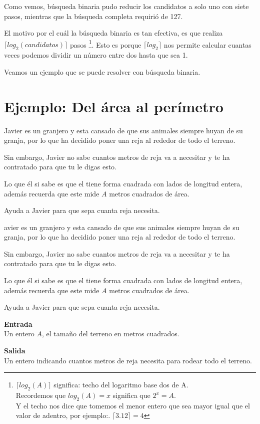 Como vemos, búsqueda binaria pudo reducir los candidatos a solo uno con siete pasos, mientras que la búsqueda completa requirió de 127.

El motivo por el cuál la búsqueda binaria es tan efectiva, es que realiza \(\lceil log_2(candidatos) \rceil\) pasos \footnote{\(\lceil log_2(A) \rceil \) significa: techo del logaritmo base dos de A.\\ Recordemos que \(log_2(A)=x\) significa que \(2^x=A\).\\ Y el techo nos dice que tomemos el menor entero que sea mayor igual que el valor de adentro, por ejemplo:. \(\lceil 3.12 \rceil =4\)}. Esto es porque \(\lceil log_2 \rceil \) nos permite calcular cuantas veces podemos dividir un número entre dos hasta que sea 1.

Veamos un ejemplo que se puede resolver con búsqueda binaria.

\section{Ejemplo: Del área al perímetro}
Javier es un granjero y esta cansado de que sus animales siempre huyan de su granja, por lo que ha decidido poner una reja al rededor de todo el terreno.

Sin embargo, Javier no sabe cuantos metros de reja va a necesitar y te ha contratado para que tu le digas esto. 

Lo que él si sabe es que el tiene forma cuadrada con lados de longitud entera, además recuerda que este mide \(A\) metros cuadrados de área.

Ayuda a Javier para que sepa cuanta reja necesita.

avier es un granjero y esta cansado de que sus animales siempre huyan de su granja, por lo que ha decidido poner una reja al rededor de todo el terreno.

Sin embargo, Javier no sabe cuantos metros de reja va a necesitar y te ha contratado para que tu le digas esto. 

Lo que él si sabe es que el tiene forma cuadrada con lados de longitud entera, además recuerda que este mide \(A\) metros cuadrados de área.

Ayuda a Javier para que sepa cuanta reja necesita.

\textbf{Entrada}\\
Un entero \(A\), el tamaño del terreno en metros cuadrados.

\textbf{Salida}\\
Un entero indicando cuantos metros de reja necesita para rodear todo el terreno. 

